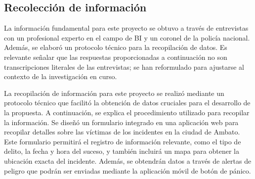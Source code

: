 \subsection{Recolección de información}


La información fundamental para este proyecto se obtuvo a través de entrevistas con un profesional experto
en el campo de BI y un coronel de la policía nacional. Además, se elaboró un protocolo técnico para la
recopilación de datos.
\bigbreak
Es relevante señalar que las respuestas proporcionadas a continuación no son transcripciones literales
de las entrevistas; se han reformulado para ajustarse al contexto de la investigación en curso.





La recopilación de información para este proyecto se realizó mediante un protocolo técnico que facilitó la
obtención de datos cruciales para el desarrollo de la propuesta. A continuación, se explica el procedimiento
utilizado para recopilar la información.
\bigbreak
Se diseñó un formulario integrado en una aplicación web para recopilar detalles sobre las víctimas de los incidentes
en la ciudad de Ambato. Este formulario permitirá el registro de información relevante, como el tipo de delito,
la fecha y hora del suceso, y también incluirá un mapa para obtener la ubicación exacta del incidente. Además,
se obtendrán datos a través de alertas de peligro que podrán ser enviadas mediante la aplicación móvil de botón de pánico.